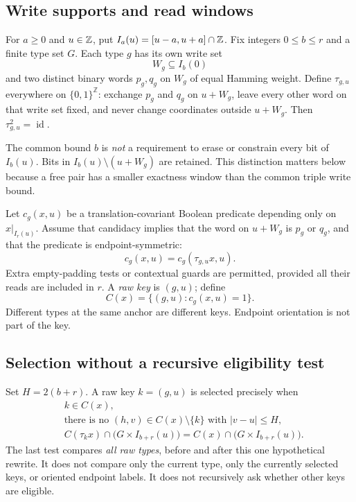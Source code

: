 \documentclass[11pt,a4paper]{article}
\numberwithin{equation}{section}
\newcommand{\X}{\{0,1\}^{\mathbb Z}}\newcommand{\id}{\operatorname{id}}
\begin{document}
\subsection{Write supports and read windows}
For $a\ge0$ and $u\in\mathbb Z$, put $I_a(u)=[u-a,u+a]\cap\mathbb Z$. Fix integers $0\le b\le r$ and a finite type set $G$. Each type $g$ has its own write set
\[
 W_g\subseteq I_b(0)
\]
and two distinct binary words $p_g,q_g$ on $W_g$ of equal Hamming weight. Define $\tau_{g,u}$ everywhere on $\X$: exchange $p_g$ and $q_g$ on $u+W_g$, leave every other word on that write set fixed, and never change coordinates outside $u+W_g$. Then $\tau_{g,u}^2=\id$.

The common bound $b$ is \emph{not} a requirement to erase or constrain every bit of $I_b(u)$. Bits in $I_b(u)\setminus(u+W_g)$ are retained. This distinction matters below because a free pair has a smaller exactness window than the common triple write bound.

Let $c_g(x,u)$ be a translation-covariant Boolean predicate depending only on $x|_{I_r(u)}$. Assume that candidacy implies that the word on $u+W_g$ is $p_g$ or $q_g$, and that the predicate is endpoint-symmetric:
\begin{equation}\label{fpa:pi:eq:symmetry}
 c_g(x,u)=c_g(\tau_{g,u}x,u).
\end{equation}
Extra empty-padding tests or contextual guards are permitted, provided all their reads are included in $r$. A \emph{raw key} is $(g,u)$; define
\[
 C(x)=\{(g,u):c_g(x,u)=1\}.
\]
Different types at the same anchor are different keys. Endpoint orientation is not part of the key.

\subsection{Selection without a recursive eligibility test}
Set $H=2(b+r)$. A raw key $k=(g,u)$ is selected precisely when
\begin{align}
 &k\in C(x),\label{fpa:pi:eq:candidate}\\
 &\text{there is no }(h,v)\in C(x)\setminus\{k\}\text{ with }|v-u|\le H,\label{fpa:pi:eq:isolation}\\
 &C(\tau_kx)\cap\bigl(G\times I_{b+r}(u)\bigr)
   =C(x)\cap\bigl(G\times I_{b+r}(u)\bigr).\label{fpa:pi:eq:prospective}
\end{align}
The last test compares \emph{all raw types}, before and after this one hypothetical rewrite. It does not compare only the current type, only the currently selected keys, or oriented endpoint labels. It does not recursively ask whether other keys are eligible.
\end{document}
